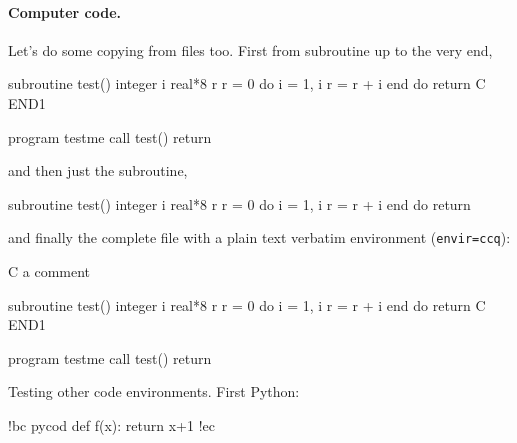 \documentclass[%
oneside,                 %
final,                   %
10pt]{article}
\theoremstyle{definition}
\begin{document}

\paragraph{Computer code.}
Let's do some copying from files too. First from subroutine up to the very end,















\bfcod
      subroutine test()
      integer i
      real*8 r
      r = 0
      do i = 1, i
         r = r + i
      end do
      return
C     END1

      program testme
      call test()
      return

\efcod

and then just the subroutine,










\bfcod

      subroutine test()
      integer i
      real*8 r
      r = 0
      do i = 1, i
         r = r + i
      end do
      return

\efcod

and finally the complete file with a plain text verbatim environment
(\texttt{envir=ccq}):
















\bccq
C     a comment

      subroutine test()
      integer i
      real*8 r
      r = 0
      do i = 1, i
         r = r + i
      end do
      return
C     END1

      program testme
      call test()
      return

\eccq


Testing other code environments. First Python:






\bdo
!bc pycod
def f(x):
    return x+1
!ec
\end{document}
